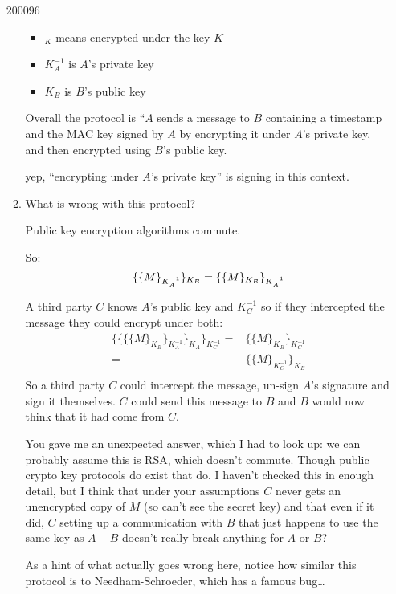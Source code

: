 \documentclass[10pt,\jkfside,a4paper]{article}
\begin{document}
\begin{enumerate}
\begin{examquestion}{2000}{9}{6}
\begin{enumerate}[label=(\alph*)]
\begin{itemize}
\item ${}_K$ means encrypted under the key $K$

\item $K_A^{-1}$ is $A$'s private key

\item $K_B$ is $B$'s public key

\end{itemize}

Overall the protocol is ``$A$ sends a message to $B$ containing a timestamp
and the MAC key signed by $A$ by encrypting it under $A$'s private key, and
then encrypted using $B$'s public key.

{\color{blue}
yep, ``encrypting under $A$'s private key'' is signing in this context.
}

\item What is wrong with this protocol?

Public key encryption algorithms commute.

So:
\[
\{\{M\}_{K_A^{-1}}\}_{K_B} = \{\{M\}_{K_B}\}_{K_A^{-1}} \\
\]

A third party $C$ knows $A$'s public key and $K_C^{-1}$ so if they
intercepted the message they could encrypt under both:
\[
\begin{split}
\{\{\{\{M\}_{K_B}\}_{K_A^{-1}}\}_{K_A}\}_{K^{-1}_C}
=& \{\{M\}_{K_B}\}_{K^{-1}_C} \\
=& \{\{M\}_{K^{-1}_C}\}_{K_B} \\
\end{split}
\]
So a third party $C$ could intercept the message, un-sign $A$'s signature
and sign it themselves. $C$ could send this message to $B$ and $B$ would
now think that it had come from $C$.

{\color{blue}
You gave me an unexpected answer, which I had to look up: we can probably assume this
is RSA, which doesn't commute. Though public crypto key protocols do exist that do.
I haven't checked this in enough detail, but I think that under your assumptions $C$
never gets an unencrypted copy of $M$ (so can't see the secret key) and that even if it
did, $C$ setting up a communication with $B$ that just happens to use the same key as
$A-B$ doesn't really break anything for $A$ or $B$?
}

{\color{blue}
As a hint of what actually goes wrong here, notice how similar this protocol is to
Needham-Schroeder, which has a famous bug\ldots
}

\end{enumerate}


\end{examquestion}
\end{enumerate}
\end{document}
